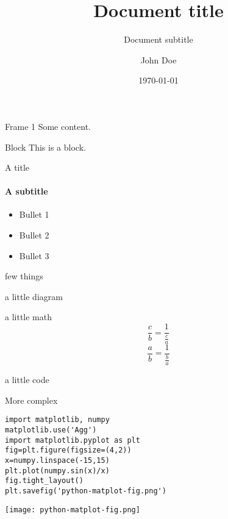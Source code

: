 \documentclass[presentation,11pt]{beamer}
\author{John Doe}
\date{\today}
\title{Document title}
\subtitle{Document subtitle}
\begin{document}
\maketitle

\begin{frame}[label={sec:org9a63710}]{Frame 1}
Some content.

\begin{block}{Block}
This is a block.
\end{block}
\end{frame}

\begin{frame}[label={sec:org36da312}]{A title}
\framesubtitle{A subtitle}
\begin{itemize}
\item Bullet 1
\item Bullet 2
\item Bullet 3
\end{itemize}
\end{frame}

\begin{frame}[label={sec:org95ee54a}]{few things}
\begin{block}{a little diagram}
\usetikzlibrary{shapes,arrows}
\end{block}
\begin{block}{a little math}
$$ \frac{c}{b} = \frac{1}{\frac{c}{a}} $$
$$ \frac{a}{b} = \frac{1}{\frac{b}{a}} $$
\end{block}
\end{frame}

\begin{frame}[label={sec:org206f22a}]{a little code}
\end{frame}
\begin{frame}[fragile,label={sec:orgeba05e6}]{More complex}
 \begin{verbatim}
import matplotlib, numpy
matplotlib.use('Agg')
import matplotlib.pyplot as plt
fig=plt.figure(figsize=(4,2))
x=numpy.linspace(-15,15)
plt.plot(numpy.sin(x)/x)
fig.tight_layout()
plt.savefig('python-matplot-fig.png')
\end{verbatim}

\texttt{[image: python-matplot-fig.png]}
\end{frame}
\end{document}
